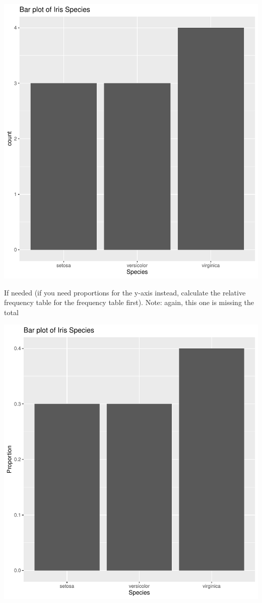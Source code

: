 \documentclass[
]{book}
\theoremstyle{definition}
\theoremstyle{definition}
\theoremstyle{definition}
\theoremstyle{definition}
\theoremstyle{remark}
\begin{document}
\includegraphics{_main_files/figure-latex/unnamed-chunk-4-1.pdf}

If needed (if you need proportions for the y-axis instead, calculate the
relative frequency table for the frequency table first). Note: again,
this one is missing the total

\includegraphics{_main_files/figure-latex/unnamed-chunk-6-1.pdf}
\end{document}
